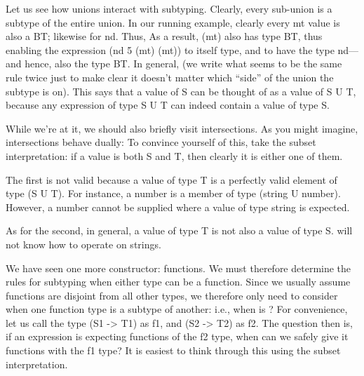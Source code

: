 \secdown


Let us see how unions interact with subtyping. Clearly, every sub-union is a
subtype of the entire union. In our running example, clearly every mt value is
also a BT; likewise for nd. Thus,
As a result, (mt) also has type BT, thus enabling the expression (nd 5 (mt)
(mt)) to itself type, and to have the type nd—and hence, also the type BT. In
general,
(we write what seems to be the same rule twice just to make clear it doesn’t
matter which “side” of the union the subtype is on). This says that a value of S
can be thought of as a value of S U T, because any expression of type S U T can
indeed contain a value of type S.


While we’re at it, we should also briefly visit intersections. As you might
imagine, intersections behave dually:
To convince yourself of this, take the subset interpretation: if a value is both
S and T, then clearly it is either one of them.


The first is not valid because a value of type T is a perfectly valid element of
type (S U T). For instance, a number is a member of type (string U number).
However, a number cannot be supplied where a value of type string is expected.

As for the second, in general, a value of type T is not also a value of type S.
will not know how to operate on strings.


We have seen one more constructor: functions. We must therefore determine the
rules for subtyping when either type can be a function. Since we usually assume
functions are disjoint from all other types, we therefore only need to consider
when one function type is a subtype of another: i.e., when is
? For convenience, let us call the type (S1 -> T1) as f1, and (S2 -> T2) as f2.
The question then is, if an expression is expecting functions of the f2 type,
when can we safely give it functions with the f1 type? It is easiest to think
through this using the subset interpretation.

